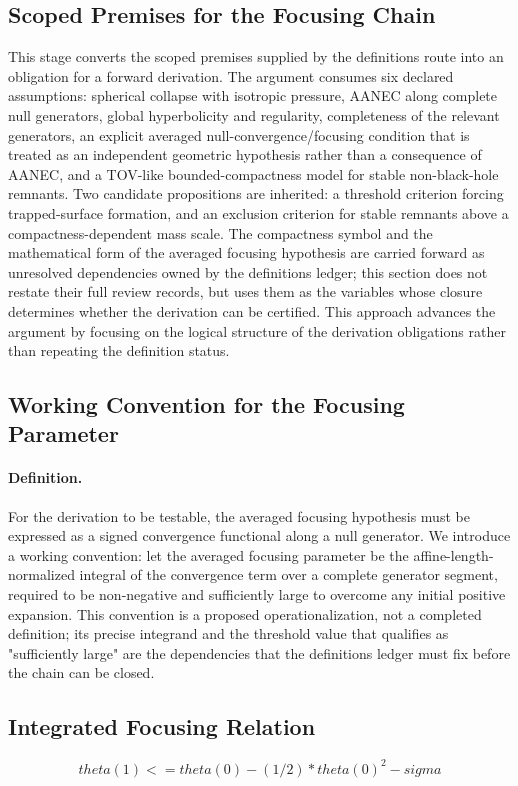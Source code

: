 \documentclass[conference]{IEEEtran}
\begin{document}
\subsection{Scoped Premises for the Focusing Chain}
This stage converts the scoped premises supplied by the definitions route into an obligation for a forward derivation. The argument consumes six declared assumptions: spherical collapse with isotropic pressure, AANEC along complete null generators, global hyperbolicity and regularity, completeness of the relevant generators, an explicit averaged null-convergence/focusing condition that is treated as an independent geometric hypothesis rather than a consequence of AANEC, and a TOV-like bounded-compactness model for stable non-black-hole remnants. Two candidate propositions are inherited: a threshold criterion forcing trapped-surface formation, and an exclusion criterion for stable remnants above a compactness-dependent mass scale. The compactness symbol and the mathematical form of the averaged focusing hypothesis are carried forward as unresolved dependencies owned by the definitions ledger; this section does not restate their full review records, but uses them as the variables whose closure determines whether the derivation can be certified. This approach advances the argument by focusing on the logical structure of the derivation obligations rather than repeating the definition status.

\subsection{Working Convention for the Focusing Parameter}
\paragraph{Definition.} For the derivation to be testable, the averaged focusing hypothesis must be expressed as a signed convergence functional along a null generator. We introduce a working convention: let the averaged focusing parameter be the affine-length-normalized integral of the convergence term over a complete generator segment, required to be non-negative and sufficiently large to overcome any initial positive expansion. This convention is a proposed operationalization, not a completed definition; its precise integrand and the threshold value that qualifies as "sufficiently large" are the dependencies that the definitions ledger must fix before the chain can be closed.

\subsection{Integrated Focusing Relation}
\begin{equation}
theta(1) <= theta(0) - (1/2) * theta(0)^2 - sigma
\label{eq:forward-derivation-and-counterexamples-fd-eq}
\end{equation}
\end{document}
